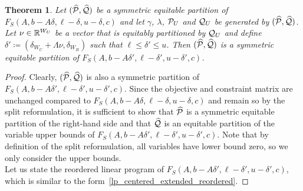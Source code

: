 \documentclass[pdflatex,sn-mathphys-num]{sn-jnl}%
\theoremstyle{thmstyleone}%
\newtheorem{theorem}[theorem]{Theorem}
\theoremstyle{thmstylethree}%
\theoremstyle{thmstyletwo}%
\begin{document}
\begin{theorem}
    \label{thm_delta_equivalent}
    Let $(\widehat{\mathcal{P}},\widehat{\mathcal{Q}})$ be a symmetric equitable partition of $F_S(A,b - A \delta, \ell - \delta, u - \delta, c)$ and let $\gamma$, $\lambda$, $\mathcal{P}_U$ and $\mathcal{Q}_U$ be generated by $(\widehat{\mathcal{P}},\widehat{\mathcal{Q}})$. Let $\nu \in \mathbb{R}^{W_U}$ be a vector that is equitably partitioned by $\mathcal{Q}_U$ and define $\delta' \coloneqq (\delta_{W_U} + \Lambda \nu,\delta_{W_B})$ such that $\ell \leq \delta' \leq u$. Then $(\widehat{\mathcal{P}},\widehat{\mathcal{Q}})$ is a symmetric equitable partition of $F_S(A,b- A \delta', \ell - \delta', u - \delta', c)$.
\end{theorem}
\begin{proof}
    Clearly, $(\widehat{\mathcal{P}},\widehat{\mathcal{Q}})$ is also a symmetric partition of $F_S(A,b- A \delta', \ell - \delta', u - \delta', c)$. Since the objective and constraint matrix are unchanged compared to $F_S(A,b- A \delta, \ell - \delta, u - \delta, c)$ and remain so by the split reformulation, it is sufficient to show that $\widehat{\mathcal{P}}$ is a symmetric equitable partition of the right-hand side and that $\widehat{\mathcal{Q}}$ is an equitable partition of the variable upper bounds of $F_S(A,b- A \delta', \ell - \delta', u - \delta', c)$. Note that by definition of the split reformulation, all variables have lower bound zero, so we only consider the upper bounds. \\

    Let us state the reordered linear program of $F_S(A,b - A \delta', \ell-\delta',u-\delta',c)$, which is similar to the form~\eqref{lp_centered_extended_reordered}.


\end{proof}
\end{document}
